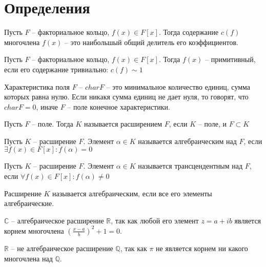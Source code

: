 \documentclass{article}
\begin{document}
\section{Определения}
\begin{definition}
    Пусть $F$ -- факториальное кольцо, $f(x) \in F[x]$. Тогда содержание $c(f)$ многочлена $f(x)$ -- это наибольшый
    общий делитель его коэффициентов.
\end{definition}

\begin{definition}
    Пусть $F$ -- факториальное кольцо, $f(x) \in F[x]$. Тогда $f(x)$ -- примитивный, если его содержание тривиально:
    $c(f) \sim 1$
\end{definition}

\begin{definition}
    Характеристика поля $F$ -- $char F$ -- это минимальное количество единиц, сумма которых равна нулю. Если никакя
    сумма единиц не дает нуля, то говорят, что $char F = 0$, иначе $F$ -- поле конечное характеристики.
\end{definition}

\begin{definition}
    Пусть $F$ -- поле. Тогда $K$ называется расширением $F$, если $K$ -- поле, и $F \subset K$
\end{definition}

\begin{definition}
    Пусть $K$ -- расширение $F$. Элемент $\alpha \in K$ называется алгебраическим над $F$, если $\exists f(x) \in F[x]:
    f(\alpha) = 0$
\end{definition}

\begin{definition}
    Пусть $K$ -- расширение $F$. Элемент $\alpha \in K$ называется трансцендентным над $F$, если $\forall f(x) \in F[x]:
    f(\alpha) \neq 0$
\end{definition}

\begin{definition}
    Расширение $K$ называется алгебраическим, если все его элементы алгебраические. 
\end{definition}

\begin{example}
    $\mathbb{C}$ -- алгебраическое расширение $\mathbb{R}$, так как любой его элемент $z = a + ib$ является корнем
    многочлена $\left( \frac{x - a}{b} \right)^2 + 1 = 0$.
\end{example}

\begin{example}
    $\mathbb{R}$ -- не алгебраическое расширение $\mathbb{Q}$, так как $\pi$ не является корнем ни какого многочлена над
    $\mathbb{Q}$.
\end{example}
\end{document}
